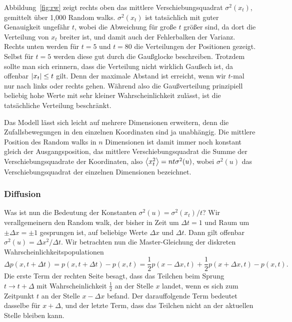 Abbildung~\ref{fig:rw} zeigt rechts oben das mittlere
Verschiebungsquadrat $\sigma^2(x_t)$, gemittelt über 1,000 Random
walks. $\sigma^2(x_t)$ ist tatsächlich mit guter Genauigkeit ungefähr
$t$, wobei die Abweichung für große $t$ größer sind, da dort die
Verteilung von $x_t$ breiter ist, und damit auch der Fehlerbalken der
Varianz. Rechts unten werden für $t=5$ und $t=80$ die Verteilungen der
Positionen gezeigt. Selbst für $t=5$ werden diese gut durch die
Gaußglocke beschreiben.  Trotzdem sollte man sich erinnern, dass die
Verteilung nicht wirklich Gaußsch ist, da offenbar $\left\lvert{x_t}\right\rvert\le t$
gilt. Denn der maximale Abstand ist erreicht, wenn wir $t$-mal nur
nach links oder rechts gehen. Während also die Gaußverteilung
prinzipiell beliebig hohe Werte mit sehr kleiner Wahrscheinlichkeit
zulässt, ist die tatsächliche Verteilung beschränkt.

Das Modell lässt sich leicht auf mehrere Dimensionen erweitern, denn
die Zufallsbewegungen in den einzelnen Koordinaten sind ja
unabhängig. Die mittlere Position des Random walks in $n$ Dimensionen
ist damit immer noch konstant gleich der Ausgangsposition, das
mittlere Verschiebungsquadrat die Summe der Verschiebungsquadrate der
Koordinaten, also $\left\langle{x_t^2}\right\rangle = n t \sigma^2(u)$, wobei
$\sigma^2(u)$ das Verschiebungsquadrat der einzelnen Dimensionen
bezeichnet.

\subsubsection{Diffusion}

Was ist nun die Bedeutung der Konstanten $\sigma^2(u) =
\sigma^2(x_t)/t$?  Wir verallgemeinern den Random walk, der bisher in
Zeit um $\Delta t=1$ und Raum um $\pm\Delta x = \pm 1$ gesprungen ist,
auf beliebige Werte $\Delta x$ und $\Delta t$. Dann gilt offenbar $
\sigma^2(u) = \Delta x^2/\Delta t$. Wir betrachten nun die
Master-Gleichung der diskreten Wahrscheinlichkeitspopulationen
\begin{equation}
  \Delta p(x, t + \Delta t) = p(x, t + \Delta t) - p(x, t) =
  \frac{1}{2}p(x - \Delta x, t) +
  \frac{1}{2}p(x + \Delta x, t) - p(x, t).
\end{equation}
Die erste Term der rechten Seite besagt, dass das Teilchen beim Sprung
$t\to t +\Delta$ mit Wahrscheinlichkeit $\frac{1}{2}$ an der Stelle
$x$ landet, wenn es sich zum Zeitpunkt $t$ an der Stelle $x-\Delta x$
befand. Der darauffolgende Term bedeutet dasselbe für $x+\Delta$, und
der letzte Term, dass das Teilchen nicht an der aktuellen Stelle
bleiben kann.

